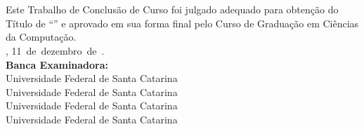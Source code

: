 
\begin{folhadeaprovacao}
	\OnehalfSpacing
	\centering
	\imprimirautor\\%
	\vspace{24pt}		
	\textbf{\imprimirtitulo}%
	\ifnotempty{\imprimirsubtitulo}{:~\imprimirsubtitulo}\\%
	\vspace*{\baselineskip}
	Este Trabalho de Conclusão de Curso foi julgado adequado para obtenção do Título de ``\imprimirformacao'' e aprovado em sua forma final pelo Curso de Graduação em Ciências da Computação.\\
	\vspace{12pt}
	\imprimirlocal, 11~de~dezembro~de~\imprimirano.\\
	
	\vspace*{18pt}
	\textbf{Banca Examinadora:}\\
	
	\vspace*{24pt}
	\assinatura{\OnehalfSpacing \imprimirbancaa}
	\vspace{6pt}
	Universidade Federal de Santa Catarina\\
	
	\vspace*{24pt}
	\assinatura{\OnehalfSpacing \imprimirbancab}
	\vspace{6pt}
	Universidade Federal de Santa Catarina\\
	
	\vspace*{24pt}
	\assinatura{\OnehalfSpacing \imprimirbancac}
	\vspace{6pt}
	Universidade Federal de Santa Catarina\\

    \vspace*{24pt}
	\assinatura{\OnehalfSpacing \imprimirbancad}
	\vspace{6pt}
	Universidade Federal de Santa Catarina\\
	
\end{folhadeaprovacao}



